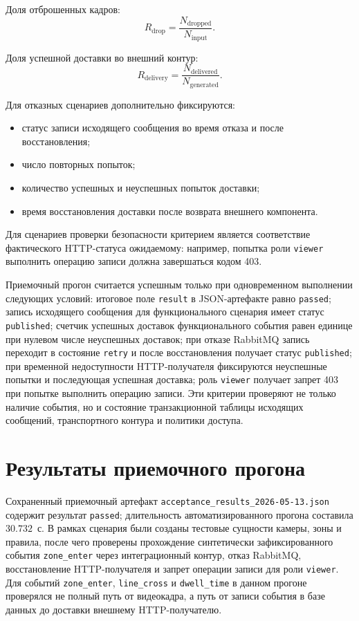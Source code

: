 Доля отброшенных кадров:
\begin{equation}
R_{\text{drop}} = \frac{N_{\text{dropped}}}{N_{\text{input}}}.
\end{equation}

Доля успешной доставки во внешний контур:
\begin{equation}
R_{\text{delivery}} = \frac{N_{\text{delivered}}}{N_{\text{generated}}}.
\end{equation}

Для отказных сценариев дополнительно фиксируются:
\begin{itemize}
    \item статус записи исходящего сообщения во время отказа и после восстановления;
    \item число повторных попыток;
    \item количество успешных и неуспешных попыток доставки;
    \item время восстановления доставки после возврата внешнего компонента.
\end{itemize}

Для сценариев проверки безопасности критерием является соответствие фактического HTTP-статуса ожидаемому: например, попытка роли \texttt{viewer} выполнить операцию записи должна завершаться кодом 403.

Приемочный прогон считается успешным только при одновременном выполнении следующих условий: итоговое поле \texttt{result} в JSON-артефакте равно \texttt{passed}; запись исходящего сообщения для функционального сценария имеет статус \texttt{published}; счетчик успешных доставок функционального события равен единице при нулевом числе неуспешных доставок; при отказе RabbitMQ запись переходит в состояние \texttt{retry} и после восстановления получает статус \texttt{published}; при временной недоступности HTTP-получателя фиксируются неуспешные попытки и последующая успешная доставка; роль \texttt{viewer} получает запрет 403 при попытке выполнить операцию записи. Эти критерии проверяют не только наличие события, но и состояние транзакционной таблицы исходящих сообщений, транспортного контура и политики доступа.

\section{Результаты приемочного прогона}

Сохраненный приемочный артефакт \texttt{acceptance\_results\_2026-05-13.json} содержит результат \texttt{passed}; длительность автоматизированного прогона составила \(30.732\)~с. В рамках сценария были созданы тестовые сущности камеры, зоны и правила, после чего проверены прохождение синтетически зафиксированного события \texttt{zone\_enter} через интеграционный контур, отказ RabbitMQ, восстановление HTTP-получателя и запрет операции записи для роли \texttt{viewer}. Для событий \texttt{zone\_enter}, \texttt{line\_cross} и \texttt{dwell\_time} в данном прогоне проверялся не полный путь от видеокадра, а путь от записи события в базе данных до доставки внешнему HTTP-получателю.

